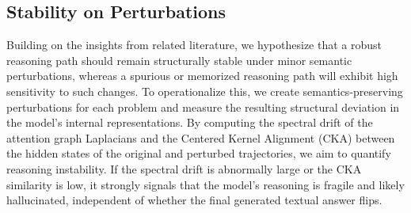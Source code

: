 \documentclass{article}
\begin{document}
\subsection{Stability on Perturbations}
Building on the insights from related literature, we hypothesize that a robust reasoning path should remain structurally stable under minor semantic perturbations, whereas a spurious or memorized reasoning path will exhibit high sensitivity to such changes. To operationalize this, we create semantics-preserving perturbations for each problem and measure the resulting structural deviation in the model's internal representations. By computing the spectral drift of the attention graph Laplacians and the Centered Kernel Alignment (CKA) between the hidden states of the original and perturbed trajectories, we aim to quantify reasoning instability. If the spectral drift is abnormally large or the CKA similarity is low, it strongly signals that the model's reasoning is fragile and likely hallucinated, independent of whether the final generated textual answer flips.




\end{document}
